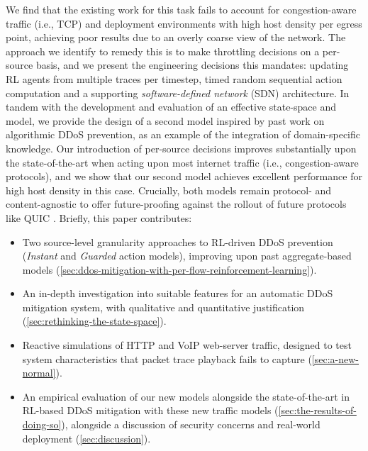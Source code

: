 \documentclass[10pt, times, comsoc]{IEEEtran}
\begin{document}
We find that the existing work for this task fails to account for congestion-aware traffic (i.e., TCP) and deployment environments with high host density per egress point, achieving poor results due to an overly coarse view of the network.
The approach we identify to remedy this is to make throttling decisions on a per-source basis, and we present the engineering decisions this mandates: updating RL agents from multiple traces per timestep, timed random sequential action computation and a supporting \emph{software-defined network} (SDN) architecture.
In tandem with the development and evaluation of an effective state-space and model, we provide the design of a second model inspired by past work on algorithmic DDoS prevention, as an example of the integration of domain-specific knowledge.
Our introduction of per-source decisions improves substantially upon the state-of-the-art when acting upon most internet traffic (i.e., congestion-aware protocols), and we show that our second model achieves excellent performance for high host density in this case.
Crucially, both models remain protocol- and content-agnostic to offer future-proofing against the rollout of future protocols like QUIC \cite{DBLP:conf/sigcomm/LangleyRWVKZYKS17}.
Briefly, this paper contributes:
\begin{itemize}
	\item Two source-level granularity approaches to RL-driven DDoS prevention (\emph{Instant} and \emph{Guarded} action models), improving upon past aggregate-based models (\cref{sec:ddos-mitigation-with-per-flow-reinforcement-learning}).
	\item An in-depth investigation into suitable features for an automatic DDoS mitigation system, with qualitative and quantitative justification (\cref{sec:rethinking-the-state-space}).
	\item Reactive simulations of HTTP and VoIP web-server traffic, designed to test system characteristics that packet trace playback fails to capture (\cref{sec:a-new-normal}).
	\item An empirical evaluation of our new models alongside the state-of-the-art in RL-based DDoS mitigation with these new traffic models (\cref{sec:the-results-of-doing-so}), alongside a discussion of security concerns and real-world deployment (\cref{sec:discussion}).
\end{itemize}
\end{document}
